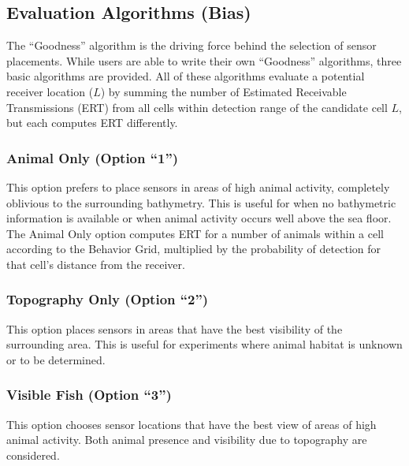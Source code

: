 \subsection{Evaluation Algorithms (Bias)}
The “Goodness” algorithm is the driving force behind the selection of sensor placements.  While users are able to write their own “Goodness” algorithms, three basic algorithms are provided.  All of these algorithms evaluate a potential receiver location ($L$) by summing the number of Estimated Receivable Transmissions (ERT) from all cells within detection range of the candidate cell $L$, but each computes ERT differently.

\subsubsection{Animal Only (Option “1”)}
This option prefers to place sensors in areas of high animal activity, completely oblivious to the surrounding bathymetry.  This is useful for when no bathymetric information is available or when animal activity occurs well above the sea floor.   The Animal Only option computes ERT for a number of animals within a cell according to the Behavior Grid, multiplied by the probability of detection for that cell's distance from the receiver.

\subsubsection{Topography Only (Option “2”)}
This option places sensors in areas that have the best visibility of the surrounding area.  This is useful for experiments where animal habitat is unknown or to be determined.

\subsubsection{Visible Fish (Option “3”)}
This option chooses sensor locations that have the best view of areas of high animal activity.  Both animal presence and visibility due to topography are considered.


